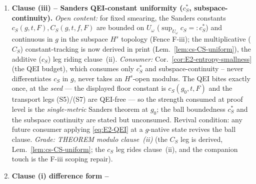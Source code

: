 \begin{enumerate}[label=\textup{(M\arabic*)},leftmargin=*]
{    $s>15$).
    The lever and the $w_0$-smoothness lemmas stand, and the discharge of
    gaps (a),(b) for the finite-part family rests on the Cauchy-estimate
    package, not on this (D0) closure.]} The honest modulo list is therefore: the
    state-leg envelope (E-env), to which the carrier
    Lem.~\ref{an17:Nc-corrected} reduces the difference data and which
    drives its PLAUSIBLE grade (the BFV-surface vanishing
    $C_{\Delta_2}=0$ itself holds identically, relocated to an anchoring
    role by \#A; revival condition attached), and \#B$'$ (the
    single-metric off-collar variant of (E-env)) for patch-traversal
    consumers; no collar$\to H^s$
    shortcut exists (the collar and $H^s$ topologies are transverse;
    the collar interpolation modulus is H\"older-$\tfrac12$, sharp).
    \emph{Consumer:} Lem.~\ref{lem:E2-energy-lipschitz},
    Thm.~\ref{thm:E2-Lipschitz}, Prop.~\ref{prop:N1-free-omega} (the
    finite-part family $\{C_W,W_*,\dots\}$); the load-bearing clause of
    the first-law extraction.  \emph{Grade: PLAUSIBLE} (the fence value
    $s>11$ inside it is a theorem-grade derivative-budget result; the
    clause as a whole is reduced, not proved).
  \item\label{item:an17-M2} \textbf{Clause (iii) -- Sanders
    QEI-constant uniformity ($c_S^*$, subspace-continuity).}
    \emph{Open content:} for fixed smearing, the Sanders constants
    $c_S(g,t,F),C_S(g,t,f,F)$ are bounded on $U_\omega$
    ($\sup_{U_\omega}c_S=:c_S^*$) and continuous in $g$ in the subspace
    $H^s$ topology (Fence F-iii); the multiplicative ($C_S$) constant-tracking is now derived in print
    (Lem.~\ref{lem:cs-CS-uniform}), the additive ($c_S$) leg riding clause~(ii).  \emph{Consumer:}
    Cor.~\ref{cor:E2-entropy-smallness} (the QEI budget), which consumes
    only $c_S^*$ and subspace-continuity -- never differentiates $c_S$ in
    $g$, never takes an $H^s$-open modulus. The QEI bites exactly once, at the \emph{seed} --- the
    displayed floor constant is $c_S(g_0,t,F)$ and the transport legs
    (S5)/(S7) are QEI-free --- so the strength consumed at proof level
    is the \emph{single-metric} Sanders theorem at $g_0$; the ball
    boundedness $c_S^*$ and the subspace continuity are stated but
    unconsumed. Revival condition: any future consumer applying
    \eqref{eq:E2-QEI} at a $g$-native state revives the ball clause.
    \emph{Grade: THEOREM modulo clause~(ii)}
    (the $C_S$ leg is derived, Lem.~\ref{lem:cs-CS-uniform}; the $c_S$ leg
    rides clause~(ii), and the companion touch is the F-iii scoping repair).
  \item\label{item:an17-M3} \textbf{Clause (i) difference form --
}
\end{enumerate}
